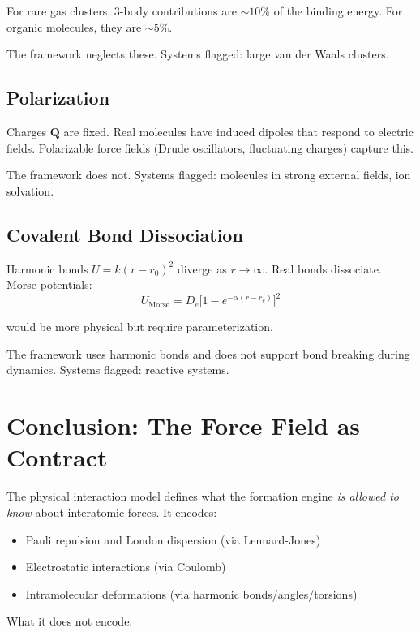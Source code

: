 \documentclass[11pt]{article}
\begin{document}
For rare gas clusters, 3-body contributions are $\sim 10\%$ of the binding energy. For organic molecules, they are $\sim 5\%$.

The framework neglects these. Systems flagged: large van der Waals clusters.

\subsection{Polarization}

Charges $\mathbf{Q}$ are fixed. Real molecules have induced dipoles that respond to electric fields. Polarizable force fields (Drude oscillators, fluctuating charges) capture this.

The framework does not. Systems flagged: molecules in strong external fields, ion solvation.

\subsection{Covalent Bond Dissociation}

Harmonic bonds $U = k(r - r_0)^2$ diverge as $r \to \infty$. Real bonds dissociate. Morse potentials:
\begin{equation}
U_{\text{Morse}} = D_e\bigl[1 - e^{-\alpha(r - r_e)}\bigr]^2
\end{equation}

would be more physical but require parameterization.

The framework uses harmonic bonds and does not support bond breaking during dynamics. Systems flagged: reactive systems.

\section{Conclusion: The Force Field as Contract}

The physical interaction model defines what the formation engine \textit{is allowed to know} about interatomic forces. It encodes:

\begin{itemize}
\item Pauli repulsion and London dispersion (via Lennard-Jones)
\item Electrostatic interactions (via Coulomb)
\item Intramolecular deformations (via harmonic bonds/angles/torsions)
\end{itemize}

What it does not encode:
\end{document}
